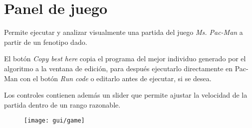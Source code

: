 \section{Panel de juego}
Permite ejecutar y analizar visualmente una partida del juego \textit{Ms. Pac-Man} a partir de un fenotipo dado.

El botón \textit{Copy best here} copia el programa del mejor individuo generado por el algoritmo a la ventana de edición, para después ejecutarlo directamente en Pac-Man con el botón \textit{Run code} o editarlo antes de ejecutar, si se desea.

Los controles contienen además un slider que permite ajustar la velocidad de la partida dentro de un rango razonable.
\begin{figure}[H]
\centering
\texttt{[image: gui/game]}
\end{figure}
